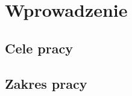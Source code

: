 \chapter{Wprowadzenie}
\label{cha:Wprowadzenie}


\section{Cele pracy}
\label{sec:Cele_pracy}


\section{Zakres pracy}
\label{sec:Zakres_pracy}
